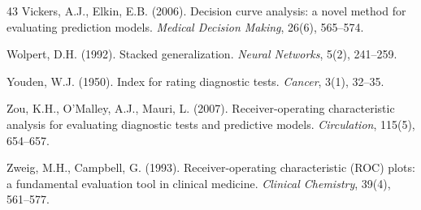 \documentclass[11pt]{article}
\begin{document}
\begin{thebibliography}{43}
Vickers, A.J., Elkin, E.B. (2006).
Decision curve analysis: a novel method for evaluating prediction models.
\textit{Medical Decision Making}, 26(6), 565--574.

Wolpert, D.H. (1992).
Stacked generalization.
\textit{Neural Networks}, 5(2), 241--259.

Youden, W.J. (1950).
Index for rating diagnostic tests.
\textit{Cancer}, 3(1), 32--35.

Zou, K.H., O'Malley, A.J., Mauri, L. (2007).
Receiver-operating characteristic analysis for evaluating diagnostic tests
and predictive models.
\textit{Circulation}, 115(5), 654--657.

Zweig, M.H., Campbell, G. (1993).
Receiver-operating characteristic (ROC) plots: a fundamental evaluation
tool in clinical medicine.
\textit{Clinical Chemistry}, 39(4), 561--577.

\end{thebibliography}
\end{document}
